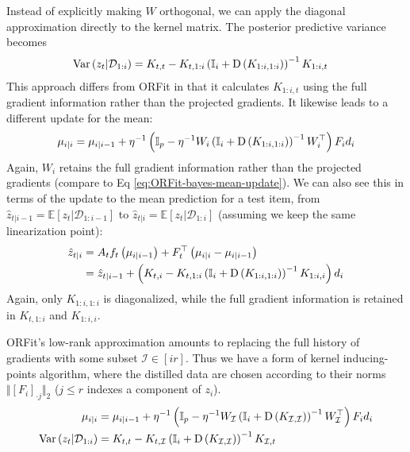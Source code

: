 Instead of explicitly making $W$ orthogonal, we can apply the diagonal
approximation directly to the kernel matrix. The posterior predictive
variance becomes 
\begin{align*}
{\rm Var}\left(z_{t}\vert\mathcal{D}_{1:i}\right) & =K_{t,t}-K_{t,1:i}\left(\mathbb{I}_{i}+{\rm D}\left(K_{1:i,1:i}\right)\right)^{-1}K_{1:i,t}
\end{align*}
This approach differs from ORFit in that it calculates $K_{1:i,t}$
using the full gradient information rather than the projected gradients.
It likewise leads to a different update for the mean:
\begin{align}
\mu_{i\vert i}=\mu_{i\vert i-1}+\eta^{-1}\left(\mathbb{I}_{p}-\eta^{-1}W_{i}\left(\mathbb{I}_{i}+{\rm D}\left(K_{1:i,1:i}\right)\right)^{-1}W_{i}^{\top}\right)F_{i}d_{i}
\end{align}
Again, $W_{i}$ retains the full gradient information rather than
the projected gradients (compare to Eq \eqref{eq:ORFit-bayes-mean-update}). We can also see this
in terms of the update to the mean prediction for a test item, from
$\hat{z}_{t\vert i-1}=\mathbb{E}\left[z_{t}\vert\mathcal{D}_{1:i-1}\right]$
to $\hat{z}_{t\vert i}=\mathbb{E}\left[z_{t}\vert\mathcal{D}_{1:i}\right]$
(assuming we keep the same linearization point):
\begin{align*}
\hat{z}_{t\vert i} & =A_{t}f_{t}\left(\mu_{i\vert i-1}\right)+F_{t}^{\top}\left(\mu_{i\vert i}-\mu_{i\vert i-1}\right)\\
 & =\hat{z}_{t\vert i-1}+\left(K_{t,i}-K_{t,1:i}\left(\mathbb{I}_{i}+{\rm D}\left(K_{1:i,1:i}\right)\right)^{-1}K_{1:i,i}\right)d_{i}
\end{align*}
Again, only $K_{1:i,1:i}$ is diagonalized, while the full gradient
information is retained in $K_{t,1:i}$ and $K_{1:i,i}$.

ORFit's low-rank approximation amounts to replacing the full history
of gradients with some subset $\mathcal{I}\in\left[ir\right]$. Thus we have a form of kernel inducing-points algorithm, where the distilled data are chosen
according to their norms $\Vert \left[F_{i}\right]_{\cdot j}\Vert_2 $
($j\le r$ indexes a component of $z_i$). 
\begin{align}
\mu_{i\vert i} & =\mu_{i\vert i-1}+\eta^{-1}\left(\mathbb{I}_{p}-\eta^{-1}W_{\mathcal{I}}\left(\mathbb{I}_{i}+{\rm D}\left(K_{\mathcal{I},\mathcal{I}}\right)\right)^{-1}W_{\mathcal{I}}^{\top}\right)F_{i}d_{i}\\
{\rm Var}\left(z_{t}\vert\mathcal{D}_{1:i}\right) & =K_{t,t}-K_{t,\mathcal{I}}\left(\mathbb{I}_{i}+{\rm D}\left(K_{\mathcal{I},\mathcal{I}}\right)\right)^{-1}K_{\mathcal{I},t}
\end{align}

